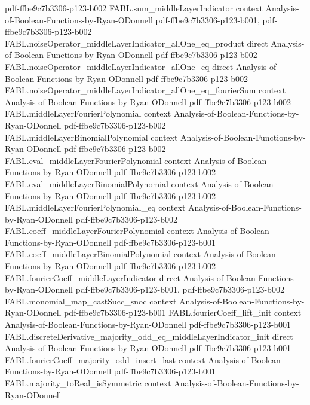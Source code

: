 \begin{theorem}
  {pdf-ffbe9c7b3306-p123-b002}
\proofstep
  {FABL.sum_middleLayerIndicator}
  {context}
  {Analysis-of-Boolean-Functions-by-Ryan-ODonnell}
  {pdf-ffbe9c7b3306-p123-b001,
    pdf-ffbe9c7b3306-p123-b002}
\proofstep
  {FABL.noiseOperator_middleLayerIndicator_allOne_eq_product}
  {direct}
  {Analysis-of-Boolean-Functions-by-Ryan-ODonnell}
  {pdf-ffbe9c7b3306-p123-b002}
\proofstep
  {FABL.noiseOperator_middleLayerIndicator_allOne_eq}
  {direct}
  {Analysis-of-Boolean-Functions-by-Ryan-ODonnell}
  {pdf-ffbe9c7b3306-p123-b002}
\proofstep
  {FABL.noiseOperator_middleLayerIndicator_allOne_eq_fourierSum}
  {context}
  {Analysis-of-Boolean-Functions-by-Ryan-ODonnell}
  {pdf-ffbe9c7b3306-p123-b002}
\proofstep
  {FABL.middleLayerFourierPolynomial}
  {context}
  {Analysis-of-Boolean-Functions-by-Ryan-ODonnell}
  {pdf-ffbe9c7b3306-p123-b002}
\proofstep
  {FABL.middleLayerBinomialPolynomial}
  {context}
  {Analysis-of-Boolean-Functions-by-Ryan-ODonnell}
  {pdf-ffbe9c7b3306-p123-b002}
\proofstep
  {FABL.eval_middleLayerFourierPolynomial}
  {context}
  {Analysis-of-Boolean-Functions-by-Ryan-ODonnell}
  {pdf-ffbe9c7b3306-p123-b002}
\proofstep
  {FABL.eval_middleLayerBinomialPolynomial}
  {context}
  {Analysis-of-Boolean-Functions-by-Ryan-ODonnell}
  {pdf-ffbe9c7b3306-p123-b002}
\proofstep
  {FABL.middleLayerFourierPolynomial_eq}
  {context}
  {Analysis-of-Boolean-Functions-by-Ryan-ODonnell}
  {pdf-ffbe9c7b3306-p123-b002}
\proofstep
  {FABL.coeff_middleLayerFourierPolynomial}
  {context}
  {Analysis-of-Boolean-Functions-by-Ryan-ODonnell}
  {pdf-ffbe9c7b3306-p123-b001}
\proofstep
  {FABL.coeff_middleLayerBinomialPolynomial}
  {context}
  {Analysis-of-Boolean-Functions-by-Ryan-ODonnell}
  {pdf-ffbe9c7b3306-p123-b002}
\proofstep
  {FABL.fourierCoeff_middleLayerIndicator}
  {direct}
  {Analysis-of-Boolean-Functions-by-Ryan-ODonnell}
  {pdf-ffbe9c7b3306-p123-b001,
    pdf-ffbe9c7b3306-p123-b002}
\proofstep
  {FABL.monomial_map_castSucc_snoc}
  {context}
  {Analysis-of-Boolean-Functions-by-Ryan-ODonnell}
  {pdf-ffbe9c7b3306-p123-b001}
\proofstep
  {FABL.fourierCoeff_lift_init}
  {context}
  {Analysis-of-Boolean-Functions-by-Ryan-ODonnell}
  {pdf-ffbe9c7b3306-p123-b001}
\proofstep
  {FABL.discreteDerivative_majority_odd_eq_middleLayerIndicator_init}
  {direct}
  {Analysis-of-Boolean-Functions-by-Ryan-ODonnell}
  {pdf-ffbe9c7b3306-p123-b001}
\proofstep
  {FABL.fourierCoeff_majority_odd_insert_last}
  {context}
  {Analysis-of-Boolean-Functions-by-Ryan-ODonnell}
  {pdf-ffbe9c7b3306-p123-b001}
\proofstep
  {FABL.majority_toReal_isSymmetric}
  {context}
  {Analysis-of-Boolean-Functions-by-Ryan-ODonnell}

\end{theorem}
